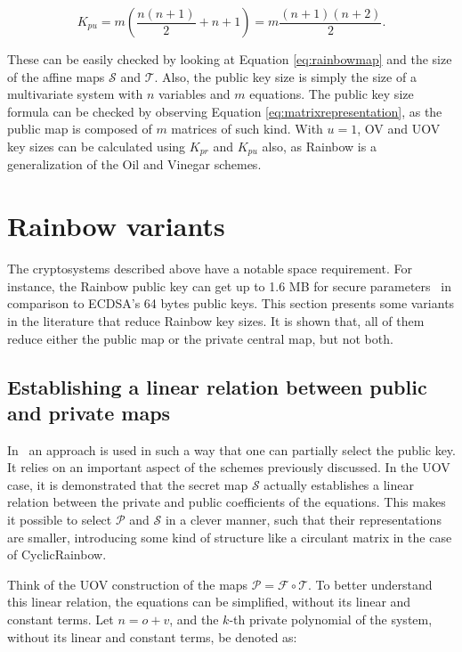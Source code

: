 \documentclass{ufsctex/ufsctex}
\begin{document}
\begin{equation}
K_{pu} = m \left( \frac{n (n + 1)}{2} + n + 1 \right)
= m \frac{(n+1)(n+2)}{2}.
\end{equation}

These can be easily checked by looking at Equation \ref{eq:rainbowmap} and the
size of the affine maps $\mathcal{S}$ and $\mathcal{T}$. Also, the public key
size is simply the size of a multivariate system with $n$ variables and $m$
equations. The public key size formula can be checked by observing Equation
\ref{eq:matrixrepresentation}, as the public map is composed of $m$ matrices of
such kind. With $u=1$, OV and UOV key sizes can be calculated using $K_{pr}$
and $K_{pu}$ also, as Rainbow is a generalization of the Oil and Vinegar
schemes.

\section{Rainbow variants}\label{sec:rainbowvariants}

The cryptosystems described above have a notable space requirement. For
instance, the Rainbow public key can get up to 1.6 MB for secure
parameters~\cite[Table 2]{ding2017nist} in comparison to ECDSA's 64 bytes
public keys. This section presents some variants in the literature that reduce
Rainbow key sizes. It is shown that, all of them reduce either the public map
or the private central map, but not both.

\subsection{Establishing a linear relation between public and private maps}
\label{sec:relation}

In~\cite{petzoldt2010cyclicrainbow} an approach is used in such a way that one
can partially select the public key. It relies on an important aspect of the
schemes previously discussed. In the UOV case, it is demonstrated that the
secret map $\mathcal{S}$ actually establishes a linear relation between the
private and public coefficients of the equations. This makes it possible to
select $\mathcal{P}$ and $\mathcal{S}$ in a clever manner, such that their
representations are smaller, introducing some kind of structure like a
circulant matrix in the case of CyclicRainbow.

Think of the UOV construction of the maps $\mathcal{P} = \mathcal{F} \circ
\mathcal{T}$. To better understand this linear relation, the equations can be
simplified, without its linear and constant terms. Let $n = o + v$, and the
$k$-th private polynomial of the system, without its linear and constant terms,
be denoted as:
\end{document}
